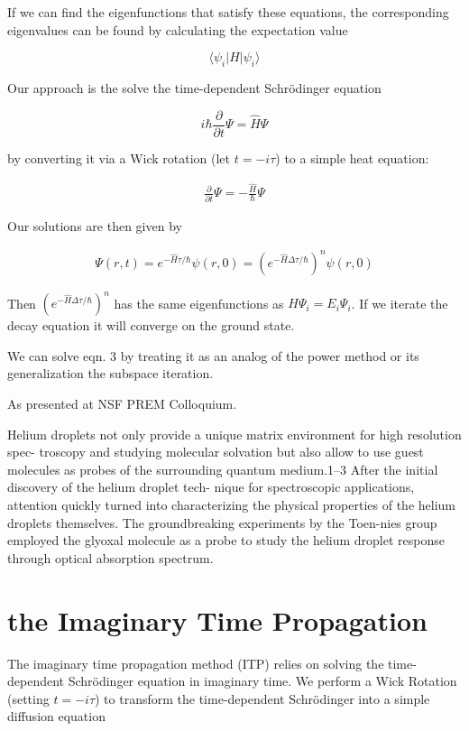 \documentclass[12pt,]{book}
\begin{document}
If we can find the eigenfunctions that satisfy these equations, the
corresponding eigenvalues can be found by calculating the expectation
value

\[\langle \psi_i \rvert H \rvert \psi_i \rangle\]

Our approach is the solve the time-dependent Schrödinger equation

\[i\hbar\frac{\partial}{\partial t}\Psi = \hat H \Psi\]

by converting it via a Wick rotation (let \(t=-i\tau\)) to a simple heat
equation:

\begin{align*}
\frac{\partial}{\partial t}\Psi=-\frac{\hat H}{\hbar}\Psi\tag{eqn. 2}
\end{align*}

Our solutions are then given by

\begin{align*}\Psi(r,t)=e^{-\hat H\tau/\hbar}\psi(r,0)=\left(e^{-\hat H\Delta\tau/\hbar}\right)^n\psi(r,0)\tag{eqn. 3}\end{align*}

Then \(\left(e^{-\hat H\Delta\tau/\hbar}\right)^n\) has the same
eigenfunctions as \(H\Psi_i=E_i\Psi_i\). If we iterate the decay
equation it will converge on the ground state.

We can solve eqn. 3 by treating it as an analog of the power method or
its generalization the subspace iteration.

As presented at NSF PREM Colloquium.

Helium droplets not only provide a unique matrix environment for high
resolution spec- troscopy and studying molecular solvation but also
allow to use guest molecules as probes of the surrounding quantum
medium.1--3 After the initial discovery of the helium droplet tech-
nique for spectroscopic applications, attention quickly turned into
characterizing the physical properties of the helium droplets
themselves. The groundbreaking experiments by the Toen-nies group
employed the glyoxal molecule as a probe to study the helium droplet
response through optical absorption spectrum.

\section{the Imaginary Time
Propagation}\label{the-imaginary-time-propagation}

The imaginary time propagation method (ITP) relies on solving the
time-dependent Schrödinger equation in imaginary time. We perform a Wick
Rotation (setting \(t=-i\tau\)) to transform the time-dependent
Schrödinger into a simple diffusion equation
\end{document}
